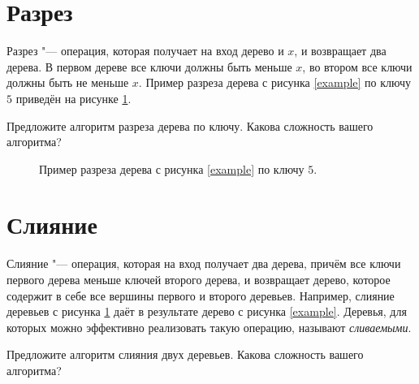 \documentclass[12pt]{article}
\begin{document}
\section{\texorpdfstring{Разрез}{Task 2}}
Разрез "--- операция, которая получает на вход дерево и $x$, и возвращает два
дерева. В первом дереве все ключи должны быть меньше $x$, во втором все ключи
должны быть не меньше $x$.  Пример разреза дерева с рисунка \ref{example} по
ключу $5$ приведён на рисунке \ref{split}.

Предложите алгоритм разреза дерева по ключу. Какова сложность вашего алгоритма?

\begin{figure}[h]
  \centering
  \caption{Пример разреза дерева с рисунка \ref{example} по ключу $5$.}
  \label{split}
\end{figure}

\section{\texorpdfstring{Слияние}{Task 3}}
Слияние "--- операция, которая на вход получает два дерева, причём все ключи
первого дерева меньше ключей второго дерева, и возвращает дерево, которое
содержит в себе все вершины первого и второго деревьев. Например, слияние
деревьев с рисунка \ref{split} даёт в результате дерево с рисунка \ref{example}.
Деревья, для которых можно эффективно реализовать такую операцию, называют
\emph{сливаемыми}.

Предложите алгоритм слияния двух деревьев. Какова сложность вашего алгоритма?
\end{document}
